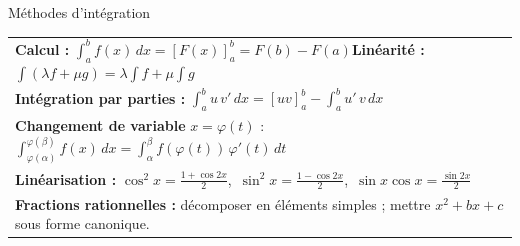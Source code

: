 \documentclass[10pt,a4paper,landscape]{article}
\begin{document}
\begin{minipage}[t]{0.495\textwidth}
\vspace{6pt}
\begin{cbox}{Méthodes d'intégration}
\begin{tabular}{@{}l@{}}
\textbf{Calcul :} $\displaystyle\int_a^bf(x)\,dx=[F(x)]_a^b=F(b)-F(a)$\qquad \textbf{Linéarité :} $\displaystyle\int(\lambda f+\mu g)=\lambda\!\int\! f+\mu\!\int\! g$\\[5pt]
\textbf{Intégration par parties :} $\displaystyle\int_a^bu\,v'\,dx=[uv]_a^b-\int_a^bu'\,v\,dx$\\[5pt]
\textbf{Changement de variable} $x=\varphi(t)$ : $\displaystyle\int_{\varphi(\alpha)}^{\varphi(\beta)}f(x)\,dx=\int_\alpha^\beta f(\varphi(t))\,\varphi'(t)\,dt$\\[5pt]
\textbf{Linéarisation :} $\cos^2x=\frac{1+\cos2x}2$,\ $\sin^2x=\frac{1-\cos2x}2$,\ $\sin x\cos x=\frac{\sin2x}2$\\[3pt]
\textbf{Fractions rationnelles :} décomposer en éléments simples ; mettre $x^2+bx+c$ sous forme canonique.
\end{tabular}
\end{cbox}
\end{minipage}\hfill
\end{document}
